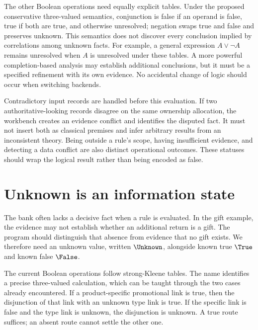 The other Boolean operations need equally explicit tables. Under the proposed
conservative three-valued semantics, conjunction is false if an operand is false,
true if both are true, and otherwise unresolved; negation swaps true and false
and preserves unknown. This semantics does not discover every conclusion implied
by correlations among unknown facts. For example, a general expression
$A\lor\neg A$ remains unresolved when $A$ is unresolved under these tables.
A more powerful completion-based analysis may establish additional conclusions,
but it must be a specified refinement with its own evidence. No accidental
change of logic should occur when switching backends.

Contradictory input records are handled before this evaluation. If two
authoritative-looking records disagree on the same ownership allocation, the
workbench creates an evidence conflict and identifies the disputed fact. It must
not insert both as classical premises and infer arbitrary results from an
inconsistent theory. Being outside a rule's scope, having insufficient evidence,
and detecting a data conflict are also distinct operational outcomes. These
statuses should wrap the logical result rather than being encoded as false.

\section{Unknown is an information state}
\label{merge:M03:05}

\label{sec:proof-unknown}
The bank often lacks a decisive fact when a rule is evaluated. In the gift
example, the evidence may not establish whether an additional return is a gift.
The program should distinguish that absence from evidence that no gift exists.
We therefore need an unknown value, written $\Unknown$, alongside known true
$\True$ and known false $\False$.

The current Boolean operations follow strong-Kleene tables. The name identifies
a precise three-valued calculation, which can be taught through the two cases
already encountered. If a product-specific promotional link is true, then the
disjunction of that link with an unknown type link is true. If the specific
link is false and the type link is unknown, the disjunction is unknown. A true
route suffices; an absent route cannot settle the other one.

